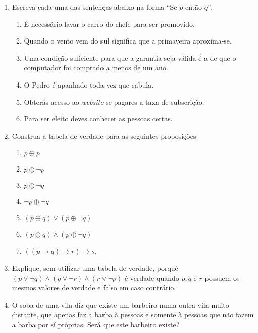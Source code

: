 \begin{enumerate}
  	\item Escreva cada uma das sentenças abaixo na forma ``Se $p$ então $q$''.
  	\begin{enumerate}
  	  \item É necessário lavar o carro do chefe para ser promovido.
  	  \item Quando o vento vem do sul significa que a primaveira aproxima-se.
  	  \item Uma condição suficiente para que a garantia seja válida é a de que o computador foi comprado a menos de um ano.
  	  \item O Pedro é apanhado toda vez que cabula.
  	  \item Obterás acesso ao \emph{website} se pagares a taxa de subscrição.
  	  \item Para ser eleito deves conhecer as pessoas certas.
  	\end{enumerate}
  	\item Construa a tabela de verdade para as seguintes proposições
  	\begin{enumerate}
  	  \item $p \oplus p$ \item $p \oplus \lnot p$ \item $p \oplus \lnot q$ \item $\lnot p \oplus \lnot q$
  	  \item $(p \oplus q) \lor (p \oplus \lnot q)$ \item $(p \oplus q) \land (p \oplus \lnot q)$
  	  \item $((p \to q) \to r) \to s$.
	\end{enumerate}
	\item Explique, sem utilizar uma tabela de verdade, porquê $(p \lor \lnot q) \land (q \lor \lnot r) \land (r \lor \lnot p)$ é 
	verdade quando $p, q$ e $r$ possuem os mesmos valores de verdade e falso em caso contrário.
	\item O soba de uma vila diz que existe um barbeiro numa outra vila muito distante, que apenas faz a barba à pessoas
	e somente à pessoas que não fazem a barba por sí próprias. Será que este barbeiro existe?


\end{enumerate}

